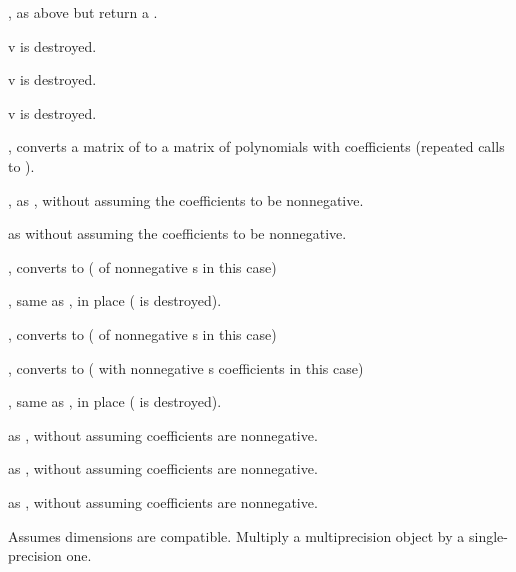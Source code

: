 , as above but return a .

 v is destroyed.

 v is destroyed.

 v is destroyed.

, converts a matrix of  to a matrix of
polynomials with  coefficients (repeated calls to ).

, as , without assuming
the coefficients to be nonnegative.

 as  without assuming
the coefficients to be nonnegative.

, converts to  ( of nonnegative
s in this case)

, same as , in place
( is destroyed).

, converts to  ( of nonnegative
s in this case)

, converts to  ( with
nonnegative s coefficients in this case)

, same as , in place
( is destroyed).

 as , without assuming
coefficients are nonnegative.

 as , without assuming
coefficients are nonnegative.

 as , without assuming
coefficients are nonnegative.



 Assumes dimensions are compatible.
Multiply a multiprecision object by a single-precision one.





